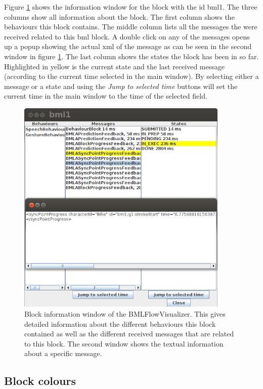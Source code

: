 \documentclass[12pt,a4paper]{article}
\begin{document}
Figure \ref{fig:info} shows the information window for the block with the id bml1. The three columns show all information about the block. The first column shows the behaviours this block contains. The middle column lists all the messages the were received related to this bml block. A double click on any of the messages opens up a popup showing the actual xml of the message as can be seen in the second window in figure \ref{fig:info}. The last column shows the states the block has been in so far. Highlighted in yellow is the current state and the last received message (according to the current time selected in the main window). By selecting either a message or a state and using the \textit{Jump to selected time} buttons will set the current time in the main window to the time of the selected field.

\begin{figure}[!htb]
\centering
 \includegraphics[width=0.9\textwidth]{images/bmlFlowBlockInfo.png}
 \caption{Block information window of the BMLFlowVisualizer. This gives detailed information about the different behaviours this block contained as well as the different received messages that are related to this block. The second window shows the textual information about a specific message.}
 \label{fig:info}
\end{figure}

\subsection{Block colours} \label{sec:colours}
\end{document}
